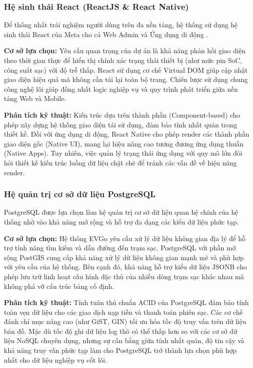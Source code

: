 \subsubsection{Hệ sinh thái React (ReactJS \& React Native)}
Để thống nhất trải nghiệm người dùng trên đa nền tảng, hệ thống sử dụng hệ sinh thái React của Meta cho cả Web Admin và Ứng dụng di động \cite{react_native_docs}.

\textbf{Cơ sở lựa chọn:}
Yêu cầu quan trọng của dự án là khả năng phản hồi giao diện theo thời gian thực để hiển thị chính xác trạng thái thiết bị (như mức pin SoC, công suất sạc) với độ trễ thấp. React sử dụng cơ chế Virtual DOM giúp cập nhật giao diện hiệu quả mà không cần tải lại toàn bộ trang. Chiến lược sử dụng chung công nghệ lõi giúp đồng nhất logic nghiệp vụ và quy trình phát triển giữa nền tảng Web và Mobile.

\textbf{Phân tích kỹ thuật:}
Kiến trúc dựa trên thành phần (Component-based) cho phép xây dựng hệ thống giao diện tái sử dụng, đảm bảo tính nhất quán trong thiết kế. Đối với ứng dụng di động, React Native cho phép render các thành phần giao diện gốc (Native UI), mang lại hiệu năng cao tương đương ứng dụng thuần (Native Apps). Tuy nhiên, việc quản lý trạng thái ứng dụng với quy mô lớn đòi hỏi thiết kế kiến trúc luồng dữ liệu chặt chẽ để tránh các vấn đề về hiệu năng render.

\subsubsection{Hệ quản trị cơ sở dữ liệu PostgreSQL}
PostgreSQL được lựa chọn làm hệ quản trị cơ sở dữ liệu quan hệ chính của hệ thống nhờ vào khả năng mở rộng và hỗ trợ đa dạng các kiểu dữ liệu phức tạp.

\textbf{Cơ sở lựa chọn:}
Hệ thống EVGo yêu cầu xử lý dữ liệu không gian địa lý để hỗ trợ tính năng tìm kiếm và dẫn đường đến trạm sạc. PostgreSQL với phần mở rộng PostGIS \cite{postgresql_postgis} cung cấp khả năng xử lý dữ liệu không gian mạnh mẽ và phù hợp với yêu cầu của hệ thống. Bên cạnh đó, khả năng hỗ trợ kiểu dữ liệu JSONB cho phép lưu trữ linh hoạt cấu hình đặc thù của nhiều dòng trạm sạc khác nhau mà không phá vỡ cấu trúc bảng cố định.

\textbf{Phân tích kỹ thuật:}
Tính tuân thủ chuẩn ACID của PostgreSQL đảm bảo tính toàn vẹn dữ liệu cho các giao dịch nạp tiền và thanh toán phiên sạc. Các cơ chế đánh chỉ mục nâng cao (như GiST, GIN) tối ưu hóa tốc độ truy vấn trên dữ liệu bản đồ. Mặc dù tốc độ ghi dữ liệu log thô có thể thấp hơn so với các cơ sở dữ liệu NoSQL chuyên dụng, nhưng sự cân bằng giữa tính nhất quán, độ tin cậy và khả năng truy vấn phức tạp làm cho PostgreSQL trở thành lựa chọn phù hợp nhất cho dữ liệu nghiệp vụ cốt lõi.

